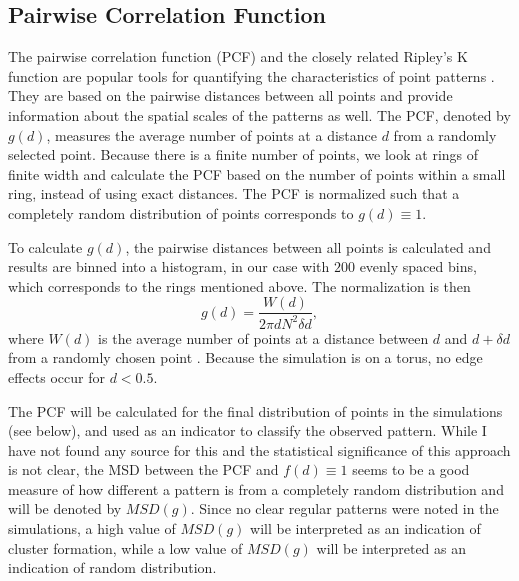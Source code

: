 \documentclass{article}
\begin{document}
\subsection{Pairwise Correlation Function}
The pairwise correlation function (PCF) and the closely related Ripley's K function are popular tools for quantifying the characteristics of point patterns \autocite{wiegandRingsCirclesNullmodels2004}. 
They are based on the pairwise distances between all points and provide information about the spatial scales of the patterns as well.
The PCF, denoted by $g(d)$, measures the average number of points at a distance $d$ from a randomly selected point.
Because there is a finite number of points, we look at rings of finite width and calculate the PCF based on the number of points within a small ring, instead of using exact distances.
The PCF is normalized such that a completely random distribution of points corresponds to $g(d) \equiv 1$.

To calculate $g(d)$, the pairwise distances between all points is calculated and results are binned into a histogram, in our case with $200$ evenly spaced bins, which corresponds to the rings mentioned above.
The normalization is then 
\begin{equation}
    g(d) = \frac{W(d)}{2\pi d  N^2 \delta d},
\end{equation}
where $W(d)$ is the average number of points at a distance between $d$ and $d + \delta d$ from a randomly chosen point \cite{52PairCorrelation}.
Because the simulation is on a torus, no edge effects occur for $d < 0.5$.

The PCF will be calculated for the final distribution of points in the simulations (see below), and used as an indicator to classify the observed pattern.
While I have not found any source for this and the statistical significance of this approach is not clear, the MSD between the PCF and $f(d) \equiv 1$ seems to be a good measure of how different a pattern is from a completely random distribution and will be denoted by $MSD(g)$. 
Since no clear regular patterns were noted in the simulations, a high value of $MSD(g)$ will be interpreted as an indication of cluster formation, while a low value of $MSD(g)$ will be interpreted as an indication of random distribution.
\end{document}
